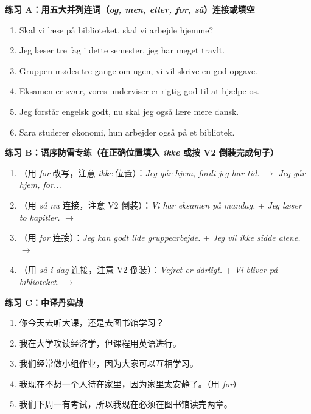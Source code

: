 \textbf{练习 A：用五大并列连词（\textit{og, men, eller, for, så}）连接或填空}
\begin{enumerate}
  \item Skal vi læse på biblioteket, \underline{\hspace{1.8cm}} skal vi arbejde hjemme?
  \item Jeg læser tre fag i dette semester, \underline{\hspace{1.8cm}} jeg har meget travlt.
  \item Gruppen mødes tre gange om ugen, \underline{\hspace{1.8cm}} vi vil skrive en god opgave.
  \item Eksamen er svær, \underline{\hspace{1.8cm}} vores underviser er rigtig god til at hjælpe os.
  \item Jeg forstår engelsk godt, \underline{\hspace{1.8cm}} nu skal jeg også lære mere dansk.
  \item Sara studerer økonomi, \underline{\hspace{1.8cm}} hun arbejder også på et bibliotek.
\end{enumerate}

\textbf{练习 B：语序防雷专练（在正确位置填入 \textit{ikke} 或按 V2 倒装完成句子）}
\begin{enumerate}
  \item （用 \textit{for} 改写，注意 \textit{ikke} 位置）：\textit{Jeg går hjem, fordi jeg  har tid.} $\rightarrow$ \textit{Jeg går hjem, for...}
  \item （用 \textit{så nu} 连接，注意 V2 倒装）：\textit{Vi har eksamen på mandag.} + \textit{Jeg læser to kapitler.} $\rightarrow$
  \item （用 \textit{for} 连接）：\textit{Jeg kan godt lide gruppearbejde.} + \textit{Jeg vil ikke sidde alene.} $\rightarrow$
  \item （用 \textit{så i dag} 连接，注意 V2 倒装）：\textit{Vejret er dårligt.} + \textit{Vi bliver på biblioteket.} $\rightarrow$
\end{enumerate}

\textbf{练习 C：中译丹实战}
\begin{enumerate}
  \item 你今天去听大课，还是去图书馆学习？
  \item 我在大学攻读经济学，但课程用英语进行。
  \item 我们经常做小组作业，因为大家可以互相学习。
  \item 我现在不想一个人待在家里，因为家里太安静了。（用 \textit{for}）
  \item 我们下周一有考试，所以我现在必须在图书馆读完两章。
\end{enumerate}

